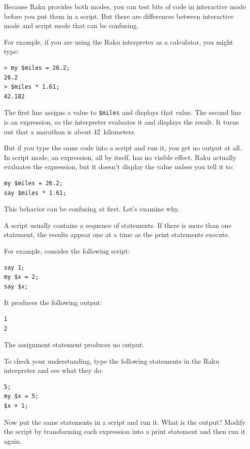 Because Raku provides both modes,
you can test bits of code in interactive mode before you put them
in a script.  But there are differences between interactive mode
and script mode that can be confusing.

For example, if you are using the Raku interpreter as a 
calculator, you might type:

\begin{verbatim}
> my $miles = 26.2;
26.2
> $miles * 1.61;
42.182
\end{verbatim}

The first line assigns a value to {\tt \$miles} and displays that value.  
The second line is an expression, so the
interpreter evaluates it and displays the result.  It turns out that a
marathon is about 42~kilometers.

But if you type the same code into a script and run it, you get no
output at all.  In script mode, an expression, all by itself, has no
visible effect.  Raku actually evaluates the expression, but it doesn't
display the value unless you tell it to:

\begin{verbatim}
my $miles = 26.2;
say $miles * 1.61;
\end{verbatim}

This behavior can be confusing at first. Let's examine why.

A script usually contains a sequence of statements.  If there
is more than one statement, the results appear one at a time
as the print statements execute.

For example, consider the following script:

\begin{verbatim}
say 1;
my $x = 2;
say $x;
\end{verbatim}
%
It produces the following output:

\begin{verbatim}
1
2
\end{verbatim}
%
The assignment statement produces no output.

To check your understanding, type the following statements in the
Raku interpreter and see what they do:

\begin{verbatim}
5;
my $x = 5;
$x + 1;
\end{verbatim}

Now put the same statements in a script and run it.  What
is the output?  Modify the script by transforming each
expression into a print statement and then run it again.

